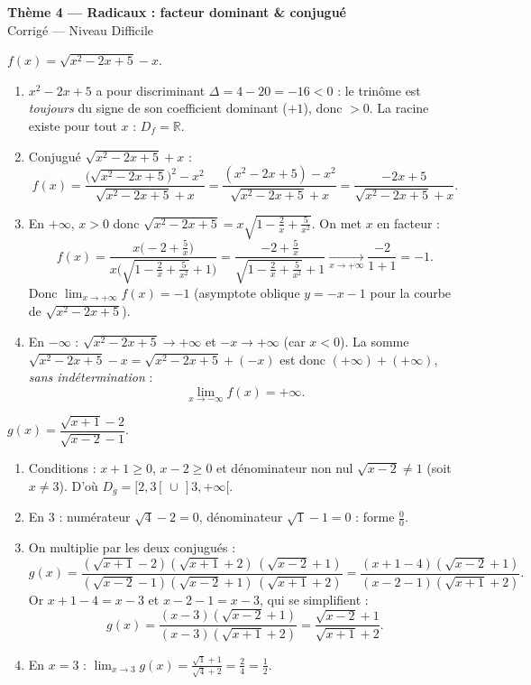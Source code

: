 \documentclass[11pt,a4paper]{article}
\newcommand{\R}{\mathbb{R}}
\begin{document}
\begin{center}
{\Large\bfseries\color{primarydark}Thème 4 — Radicaux : facteur dominant \& conjugué}\\[2pt]
{\large\color{excol}Corrigé — Niveau Difficile}
\end{center}
\vspace{6pt}

\begin{correction}
$f(x)=\sqrt{x^2-2x+5}-x$.
\begin{enumerate}[label=\alph*),leftmargin=2em,itemsep=3pt]
  \item $x^2-2x+5$ a pour discriminant $\Delta=4-20=-16<0$ : le trinôme est \emph{toujours} du signe
        de son coefficient dominant ($+1$), donc $>0$. La racine existe pour tout $x$ : $D_f=\R$.
  \item Conjugué $\sqrt{x^2-2x+5}+x$ :
  \[ f(x)=\frac{\bigl(\sqrt{x^2-2x+5}\bigr)^2-x^2}{\sqrt{x^2-2x+5}+x}=\frac{(x^2-2x+5)-x^2}{\sqrt{x^2-2x+5}+x}
     =\frac{-2x+5}{\sqrt{x^2-2x+5}+x}. \]
  \item En $+\infty$, $x>0$ donc $\sqrt{x^2-2x+5}=x\sqrt{1-\tfrac2x+\tfrac{5}{x^2}}$. On met $x$ en facteur :
  \[ f(x)=\frac{x\bigl(-2+\frac5x\bigr)}{x\bigl(\sqrt{1-\frac2x+\frac{5}{x^2}}+1\bigr)}
        =\frac{-2+\frac5x}{\sqrt{1-\frac2x+\frac{5}{x^2}}+1}\xrightarrow[x\to+\infty]{}\frac{-2}{1+1}=-1. \]
  Donc $\displaystyle\lim_{x\to+\infty} f(x)=-1$ (asymptote oblique $y=-x-1$ pour la courbe de $\sqrt{x^2-2x+5}$).
  \item En $-\infty$ : $\sqrt{x^2-2x+5}\to+\infty$ et $-x\to+\infty$ (car $x<0$). La somme
        $\sqrt{x^2-2x+5}-x=\sqrt{x^2-2x+5}+(-x)$ est donc $(+\infty)+(+\infty)$, \emph{sans indétermination} :
        \[ \lim_{x\to-\infty} f(x)=+\infty. \]
\end{enumerate}
\end{correction}

\begin{correction}
$g(x)=\dfrac{\sqrt{x+1}-2}{\sqrt{x-2}-1}$.
\begin{enumerate}[label=\alph*),leftmargin=2em,itemsep=3pt]
  \item Conditions : $x+1\geq 0$, $x-2\geq 0$ et dénominateur non nul $\sqrt{x-2}\neq 1$ (soit $x\neq 3$).
        D'où $D_g=[2,3[\,\cup\,]3,+\infty[$.
  \item En $3$ : numérateur $\sqrt{4}-2=0$, dénominateur $\sqrt{1}-1=0$ : forme $\frac00$.
  \item On multiplie par les deux conjugués :
  \[ g(x)=\frac{(\sqrt{x+1}-2)(\sqrt{x+1}+2)\,(\sqrt{x-2}+1)}{(\sqrt{x-2}-1)(\sqrt{x-2}+1)\,(\sqrt{x+1}+2)}
        =\frac{(x+1-4)(\sqrt{x-2}+1)}{(x-2-1)(\sqrt{x+1}+2)}. \]
  Or $x+1-4=x-3$ et $x-2-1=x-3$, qui se simplifient :
  \[ g(x)=\frac{(x-3)(\sqrt{x-2}+1)}{(x-3)(\sqrt{x+1}+2)}=\frac{\sqrt{x-2}+1}{\sqrt{x+1}+2}. \]
  \item En $x=3$ : $\displaystyle\lim_{x\to 3} g(x)=\frac{\sqrt{1}+1}{\sqrt{4}+2}=\frac{2}{4}=\frac12$.
\end{enumerate}
\end{correction}
\end{document}
